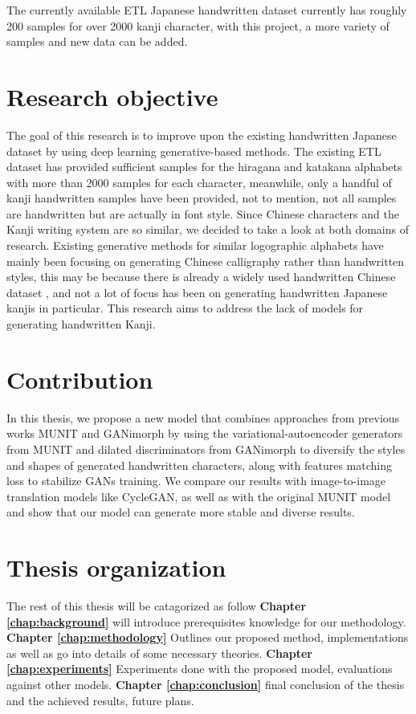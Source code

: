 \documentclass[12pt]{report}
\begin{document}
The currently available ETL Japanese handwritten dataset \cite{etl} currently has roughly 200 samples for over 2000 kanji character, with this project, a more variety of samples and new data can be added.

\section{Research objective}
The goal of this research is to improve upon the existing handwritten Japanese dataset by using deep learning generative-based methods. The existing ETL dataset has provided sufficient samples for the hiragana and katakana alphabets with more than 2000 samples for each character, meanwhile, only a handful of kanji handwritten samples have been provided, not to mention, not
all samples are handwritten but are actually in font style. Since Chinese characters and the Kanji writing system are so similar, we decided to take a look at both domains of research. Existing generative methods for similar logographic alphabets have mainly been focusing on generating Chinese calligraphy rather than handwritten styles, this may be because there is already a widely used handwritten Chinese dataset \cite{casia}, and not a lot of focus has been on generating handwritten Japanese kanjis in particular. This research aims to address the lack of models for generating handwritten Kanji.

\section{Contribution}
In this thesis, we propose a new model that combines approaches from previous works MUNIT\cite{munit} and GANimorph\cite{ganimorph} by using the variational-autoencoder generators from MUNIT and dilated discriminators from GANimorph to diversify the styles and shapes of generated handwritten characters, along with features matching loss to stabilize GANs training. We compare our results with image-to-image translation models like CycleGAN\cite{cycle-gan}, as well as with the original MUNIT\cite{munit} model and show that our model can generate more stable and diverse results.

\section{Thesis organization}
The rest of this thesis will be catagorized as follow \textbf{Chapter \ref{chap:background}} will introduce prerequisites knowledge for our methodology. \textbf{Chapter \ref{chap:methodology}} Outlines our proposed method, implementations as well as go into details of some necessary theories. \textbf{Chapter \ref{chap:experiments}} Experiments done with the proposed model, evaluations against other models. \textbf{Chapter \ref{chap:conclusion}} final conclusion of the thesis and the achieved results, future plans.
\end{document}
